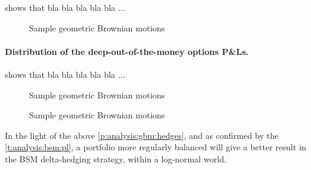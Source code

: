 \documentclass[12pt]{report}
\begin{document}
 shows that bla bla bla bla bla ...

\begin{figure}[H]
  \centering
  
  \caption{Sample geometric Brownian motions}
  \label{p:analysis:mjd:pl:dist:200}
\end{figure}



\paragraph{Distribution of the deep-out-of-the-money options P\&Ls.}

 shows that bla bla bla bla bla ...

\begin{figure}[H]
  \centering
  
  \caption{Sample geometric Brownian motions}
  \label{p:analysis:mjd:pl:dist:230}
\end{figure}




\begin{figure}[ht]
  \centering
  
  \caption{Sample geometric Brownian motions}
  \label{p:analysis:mjd:pl:dist:230}
\end{figure}











In the light of the above \cref{p:analysis:gbm:hedges}, and as confirmed by the \cref{t:analysis:bsm:pl}, a portfolio more regularly balanced will give a better result in the BSM delta-hedging strategy, within a log-normal world.
\end{document}
